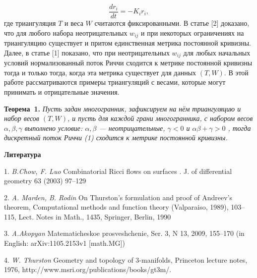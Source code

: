 $$
\dfrac{dr_i}{dt} = -K_i r_i,
$$
где триангуляция $T$ и веса $W$ считаются
фиксированными.
\newline
В статье [2] доказано, что для любого
набора неотрицательных
$w_{ij}$ и при некоторых ограничениях на
триангуляцию существует и
притом единственная метрика постоянной
кривизны. Далее, в статье [1]
показано, что при неотрицательных $w_{ij}$
для любых начальных
условий нормализованный поток Риччи
сходится к метрике постоянной
кривизны тогда и только тогда, когда эта
метрика существует для
данных $(T, W)$.
\newline
В этой работе рассматриваются примеры
триангуляций с весами, которые
могут принимать и отрицательные
значения.

\textbf{Теорема~1.} {\it Пусть задан многогранник, зафиксируем на нём триангуляцию и набор весов $(T, W)$, и пусть для каждой грани многогранника, с набором весов $ \alpha, \beta, \gamma $ выполнено условие: $\alpha, \beta$ --- неотрицательные, $\gamma < 0$ и $ \alpha \beta + \gamma > 0 $ , тогда дискретный поток Риччи (1) сходится к метрике постоянной кривизны.}

%

\smallskip \centerline{\bf Литература}\nopagebreak

1. {\it B.Chow, F. Luo} Combinatorial Ricci flows on surfaces . J. of differential geometry 63 (2003) 97–129

2. {\it A. Marden, B. Rodin} On Thurston’s formulation and proof of Andreev’s theorem, Computational methods and function theory (Valparaiso, 1989), 103–115, Lect. Notes in Math., 1435, Springer, Berlin, 1990

3. {\it A.Akopyan  } Matematicheskoe prosveshchenie, Ser. 3, N 13, 2009, 155–170 (in English: arXiv:1105.2153v1 [math.MG])

4. {\it W. Thurston } Geometry and topology of 3-manifolds, Princeton lecture notes, 1976, http://www.msri.org/publications/books/gt3m/.